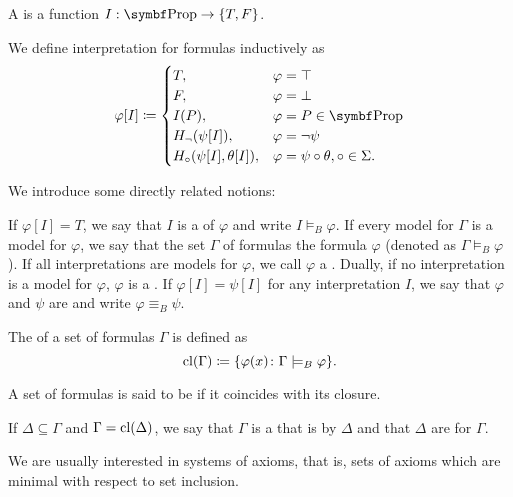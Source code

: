 \begin{definition}\label{def:propositional_interpretation}
  A  is a function \( I: \Bold{Prop} \to \{ T, F \} \).

  We define interpretation for formulas inductively as
  \begin{align*}
    \varphi[I] \coloneqq \begin{cases}
      T,                           &\varphi = \top \\
      F,                           &\varphi = \bot \\
      I(P),                        &\varphi = P \in \Bold{Prop} \\
      H_\neg(\psi[I]),             &\varphi = \neg \psi         \\
      H_\circ(\psi[I], \theta[I]), &\varphi = \psi \circ \theta, \circ \in \Sigma.
    \end{cases}
  \end{align*}

  We introduce some directly related notions:
  \begin{defenum}
     If \( \varphi[I] = T \), we say that \( I \) is a  of \( \varphi \) and write \( I \models_B \varphi \).
     If every model for \( \Gamma \) is a model for \( \varphi \), we say that the set \( \Gamma \) of formulas  the formula \( \varphi \) (denoted as \( \Gamma \models_B \varphi \)).
     If all interpretations are models for \( \varphi \), we call \( \varphi \) a .
     Dually, if no interpretation is a model for \( \varphi \), \( \varphi \) is a .
     If \( \varphi[I] = \psi[I] \) for any interpretation \( I \), we say that \( \varphi \) and \( \psi \) are  and write \( \varphi \equiv_B \psi \).
  \end{defenum}
\end{definition}

\begin{definition}\label{def:propositional_theory}\cite[definition 15.1]{OpenLogic20201202}
  The  of a set of formulas \( \Gamma \) is defined as
  \begin{equation*}
    \operatorname{cl}(\Gamma) \coloneqq \{ \varphi(x) \colon \Gamma \models_B \varphi \}.
  \end{equation*}

  A set of formulas is said to be  if it coincides with its closure.

  If \( \Delta \subseteq \Gamma \) and \( \Gamma = \operatorname{cl}(\Delta) \), we say that \( \Gamma \) is a  that is  by \( \Delta \) and that \( \Delta \) are  for \( \Gamma \).

  We are usually interested in  systems of axioms, that is, sets of axioms which are minimal with respect to set inclusion.
\end{definition}

